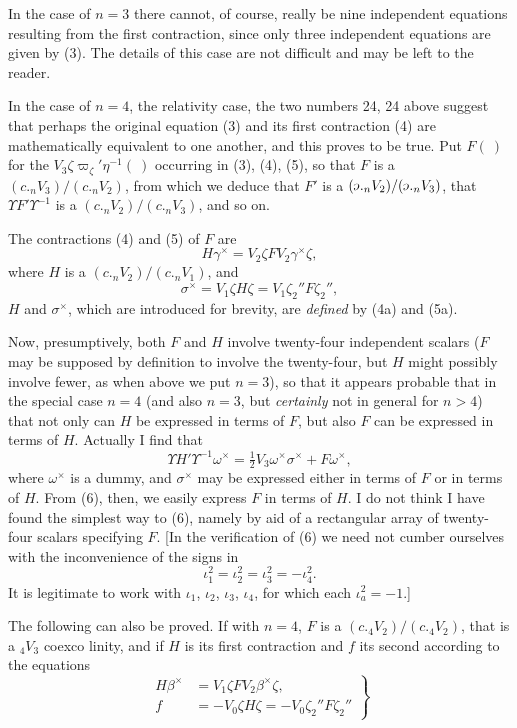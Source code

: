 \documentclass[11pt]{article}
\newcommand{\invc}{\mathord{\rotatebox[origin=c]{180}{$c$}}}
\newcommand{\invc}{\mathord{\text{\invcfont ɔ}}}
\begin{document}
\indent In the case of $n=3$ there cannot, of course, really be nine independent equations resulting from the first contraction, since only three independent equations are given by (3). The details of this case are not difficult and may be left to the reader.

\indent In the case of $n=4$, the relativity case, the two numbers 24, 24 above suggest that perhaps the original equation (3) and its first contraction (4) are mathematically equivalent to one another, and this proves to be true. Put $F(\ )$ for the $V_3\zeta\varpi_\zeta'\eta^{-1}(\ )$ occurring in (3), (4), (5), so that $F$ is a $(c.{}_nV_3)/(c.{}_nV_2)$, from which we deduce that $F'$ is a $(\invc.{}_nV_2)/(\invc.{}_nV_3)$, that $\Upsilon F'\Upsilon^{-1}$ is a $(c.{}_nV_2)/(c.{}_nV_3)$, and so on.

\indent The contractions (4) and (5) of $F$ are
\[
  H\gamma^\times=V_2\zeta FV_2\gamma^\times\zeta,
  \tag{4a}
\]
where $H$ is a $(c.{}_nV_2)/(c.{}_nV_1)$, and
\[
  \sigma^\times=V_1\zeta H\zeta=V_1\zeta_2''F\zeta_2'',
  \tag{5a}
\]
$H$ and $\sigma^\times$, which are introduced for brevity, are \emph{defined} by (4a) and (5a).

\indent Now, presumptively, both $F$ and $H$ involve twenty-four independent scalars ($F$ may be supposed by definition to involve the twenty-four, but $H$ might possibly involve fewer, as when above we put $n=3$), so that it appears probable that in the special case $n=4$ (and also $n=3$, but \emph{certainly} not in general for $n>4$) that not only can $H$ be expressed in terms of $F$, but also $F$ can be expressed in terms of $H$. Actually I find that
\[
  \Upsilon H'\Upsilon^{-1}\omega^\times=\tfrac12V_3\omega^\times\sigma^\times+F\omega^\times,
  \tag{6}
\]
where $\omega^\times$ is a dummy, and $\sigma^\times$ may be expressed either in terms of $F$ or in terms of $H$. From (6), then, we easily express $F$ in terms of $H$. I do not think I have found the simplest way to (6), namely by aid of a rectangular array of twenty-four scalars specifying $F$. [In the verification of (6) we need not cumber ourselves with the inconvenience of the signs in
\[
  \iota_1^2=\iota_2^2=\iota_3^2=-\iota_4^2.
\]
It is legitimate to work with $\iota_1$, $\iota_2$, $\iota_3$, $\iota_4$, for which each $\iota_a^2=-1$.]

\indent The following can also be proved. If with $n=4$, $F$ is a $(c.{}_4V_2)/(c.{}_4V_2)$, that is a ${}_4V_3$ coexco linity, and if $H$ is its first contraction and $f$ its second according to the equations
\[
  \left.\begin{aligned}
    H\beta^\times&=V_1\zeta FV_2\beta^\times\zeta,\\
    f&=-V_0\zeta H\zeta=-V_0\zeta_2''F\zeta_2''
  \end{aligned}\right\}
  \tag{7}
\]
\end{document}
